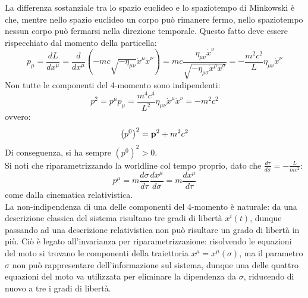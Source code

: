 La differenza sostanziale tra lo spazio euclideo e lo spaziotempo di Minkowski è che, mentre nello spazio euclideo un corpo può rimanere fermo, nello spaziotempo nessun corpo può fermarsi nella direzione temporale. Questo fatto deve essere rispecchiato dal momento della particella:
\begin{equation}
  p_{\mu} = \frac{dL}{dx^{\mu}} = \frac{d}{dx^{\mu}} \left( -mc \sqrt{- \eta_{\mu \nu}} \dot{x}^{\mu} \dot{x}^{\nu} \right) = mc \frac{\eta_{\mu \nu} \dot{x}^{\nu}}{\sqrt{- \eta_{\rho \sigma} \dot{x}^{\rho} \dot{x}^{\sigma} }} = - \frac{m^2 c^2}{L} \eta_{\mu \nu} \dot{x}^{\nu}
  \label{eq:1.20}
\end{equation}
Non tutte le componenti del 4-momento sono indipendenti:
\begin{equation}
  p^2 = p^{\mu} p_{\mu} = \frac{m^4 c^4}{L^2} \eta_{\mu \nu} \dot{x}^{\mu} \dot{x}^{\nu} = -m^2 c^2
  \label{eq:1.21}
\end{equation}
ovvero:
\begin{equation}
  \left( p^0 \right)^2 = \mathbf{p}^2 + m^2 c^2
  \label{eq:1.22}
\end{equation}
Di conseguenza, si ha sempre $ \left( p^0 \right)^2 > 0 $.\\
Si noti che riparametrizzando la worldline col tempo proprio, dato che $ \frac{d\tau}{d\sigma} = - \frac{L}{mc^2} $:
\begin{equation}
  p^{\mu} = m \frac{d\sigma}{d\tau} \frac{dx^{\mu}}{d\sigma} = m \frac{dx^{\mu}}{d\tau}
  \label{eq:1.23}
\end{equation}
come dalla cinematica relativistica.\\
La non-indipendenza di una delle componenti del 4-momento è naturale: da una descrizione classica del sistema risultano tre gradi di libertà $ x^i (t) $, dunque passando ad una descrizione relativistica non può risultare un grado di libertà in più. Ciò è legato all'invarianza per riparametrizzazione: risolvendo le equazioni del moto si trovano le componenti della traiettoria $ x^{\mu} = x^{\mu} (\sigma) $, ma il parametro $ \sigma $ non può rappresentare dell'informazione sul sistema, dunque una delle quattro equazioni del moto va utilizzata per eliminare la dipendenza da $ \sigma $, riducendo di nuovo a tre i gradi di libertà.










